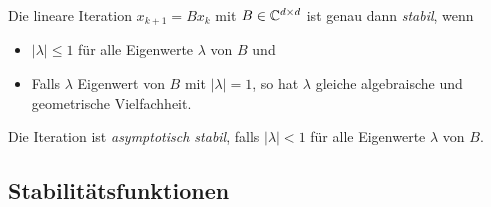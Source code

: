 \begin{satz}
	Die lineare Iteration $x_{k+1}=Bx_k$ mit $B \in \mathbb C^{d \times d}$ ist genau dann \textit{stabil}, wenn 
	\begin{itemize}
		\item $\left\vert \lambda \right\vert \leq 1$ für alle Eigenwerte $\lambda $ von $B$ und
		\item Falls $\lambda$ Eigenwert von $B$ mit $\left\vert \lambda \right\vert =1$, so hat $\lambda$ gleiche algebraische und geometrische Vielfachheit.
	\end{itemize}
	Die Iteration ist \textit{asymptotisch stabil}, falls $\left\vert \lambda \right\vert <1$ für alle Eigenwerte $\lambda$ von $B$.
\end{satz}


\subsection{Stabilitätsfunktionen}
%
%
%
%
%
%
%
